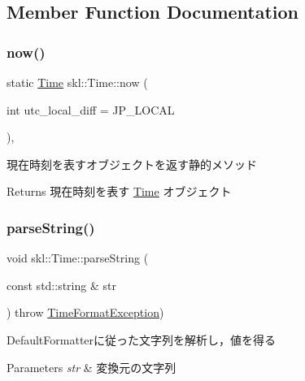 \subsection{Member Function Documentation}
\hypertarget{classskl_1_1_time_a017b1cdbe2841f1b7f4c9323e3cac184}{}\label{classskl_1_1_time_a017b1cdbe2841f1b7f4c9323e3cac184} 
\subsubsection{\texorpdfstring{now()}{now()}}
{\footnotesize\ttfamily static \hyperlink{classskl_1_1_time}{Time} skl\+::\+Time\+::now (\begin{DoxyParamCaption}\item[{int}]{utc\+\_\+local\+\_\+diff = {\ttfamily JP\+\_\+LOCAL} }\end{DoxyParamCaption})\hspace{0.3cm}{\ttfamily [inline]}, {\ttfamily [static]}}



現在時刻を表すオブジェクトを返す静的メソッド 

\begin{DoxyReturn}{Returns}
現在時刻を表す \hyperlink{classskl_1_1_time}{Time} オブジェクト 
\end{DoxyReturn}
\hypertarget{classskl_1_1_time_aa4f63cd3ca5d31ef346b034af94da928}{}\label{classskl_1_1_time_aa4f63cd3ca5d31ef346b034af94da928} 
\subsubsection{\texorpdfstring{parse\+String()}{parseString()}\hspace{0.1cm}{\footnotesize\ttfamily [1/2]}}
{\footnotesize\ttfamily void skl\+::\+Time\+::parse\+String (\begin{DoxyParamCaption}\item[{const std\+::string \&}]{str }\end{DoxyParamCaption}) throw  \hyperlink{classskl_1_1_time_format_exception}{Time\+Format\+Exception}) }



Default\+Formatterに従った文字列を解析し，値を得る 


\begin{DoxyParams}{Parameters}
{\em str} & 変換元の文字列 \\
\hline
\end{DoxyParams}
\hypertarget{classskl_1_1_time_acc9ee556bd8ddd2b85430b114892365f}{}\label{classskl_1_1_time_acc9ee556bd8ddd2b85430b114892365f} 
